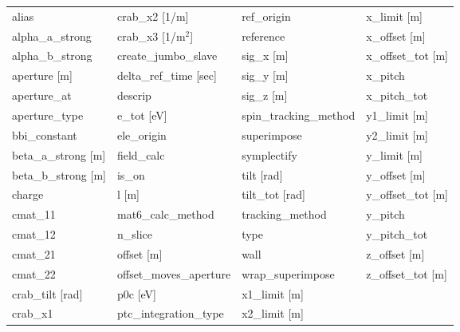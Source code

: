  \begin{tabular}{llll} \toprule
alias                            & crab_x2 [1/m]                    & ref_origin                       & x_limit [m]                      \\
alpha_a_strong                   & crab_x3 [1/m$^2$]                & reference                        & x_offset [m]                     \\
alpha_b_strong                   & create_jumbo_slave               & sig_x [m]                        & x_offset_tot [m]                 \\
aperture [m]                     & delta_ref_time [sec]             & sig_y [m]                        & x_pitch                          \\
aperture_at                      & descrip                          & sig_z [m]                        & x_pitch_tot                      \\
aperture_type                    & e_tot [eV]                       & spin_tracking_method             & y1_limit [m]                     \\
bbi_constant                     & ele_origin                       & superimpose                      & y2_limit [m]                     \\
beta_a_strong [m]                & field_calc                       & symplectify                      & y_limit [m]                      \\
beta_b_strong [m]                & is_on                            & tilt [rad]                       & y_offset [m]                     \\
charge                           & l [m]                            & tilt_tot [rad]                   & y_offset_tot [m]                 \\
cmat_11                          & mat6_calc_method                 & tracking_method                  & y_pitch                          \\
cmat_12                          & n_slice                          & type                             & y_pitch_tot                      \\
cmat_21                          & offset [m]                       & wall                             & z_offset [m]                     \\
cmat_22                          & offset_moves_aperture            & wrap_superimpose                 & z_offset_tot [m]                 \\
crab_tilt [rad]                  & p0c [eV]                         & x1_limit [m]                     &                                  \\
crab_x1                          & ptc_integration_type             & x2_limit [m]                     &                                  \\
 \bottomrule
 \end{tabular}
 \vfill
 

